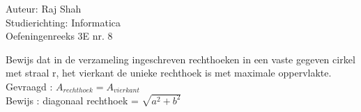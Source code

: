 \documentclass[a4paper]{article}
\begin{document}
  
\noindent \large Auteur: Raj Shah \\
\noindent \large Studierichting: Informatica\\
\noindent \large Oefeningenreeks 3E nr. 8 \\

\medskip

\normalsize

Bewijs dat in de verzameling ingeschreven rechthoeken in een vaste gegeven cirkel met straal r, het vierkant de unieke rechthoek is met maximale oppervlakte. \\

Gevraagd : $A_{rechthoek} = A_{vierkant} $ \\ 

Bewijs : diagonaal rechthoek = $\sqrt{a^2 + b^2}$\\
\end{document}
